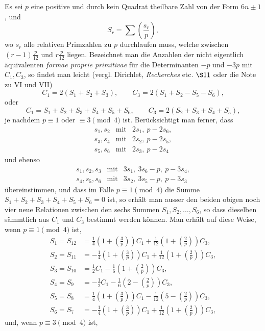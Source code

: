 \documentclass[12pt]{article}
\begin{document}
Es sei \(p\) eine positive und durch kein Quadrat theilbare Zahl von der Form \(6n\pm1\), und
\[
S_r=\sum\left(\frac{s_r}{p}\right),
\]
wo \(s_r\) alle relativen Primzahlen zu \(p\) durchlaufen muss, welche zwischen \((r-1)\frac p{12}\) und \(r\frac p{12}\) liegen. Bezeichnet man die Anzahlen der nicht eigentlich äquivalenten \emph{formae proprie primitivae} für die Determinanten \(-p\) und \(-3p\) mit \(C_1,C_3\), so findet man leicht (vergl. Dirichlet, \emph{Recherches} etc. \(\S 11\) oder die Note zu VI und VII)
\[
C_1=2(S_1+S_2+S_3),\qquad C_3=2(S_1+S_2-S_5-S_6),
\]
oder
\[
C_1=S_1+S_2+S_3+S_4+S_5+S_6,\qquad
C_3=2(S_2+S_3+S_4+S_5),
\]
je nachdem \(p\equiv1\) oder \(\equiv3\pmod4\) ist. Berücksichtigt man ferner, dass
\[
\begin{array}{rcl}
s_1,s_2&\text{mit}&2s_1,\ p-2s_6,\\
s_3,s_4&\text{mit}&2s_2,\ p-2s_5,\\
s_5,s_6&\text{mit}&2s_3,\ p-2s_4
\end{array}
\]
und ebenso
\[
\begin{array}{rcl}
s_1,s_2,s_3&\text{mit}&3s_1,\ 3s_6-p,\ p-3s_4,\\
s_4,s_5,s_6&\text{mit}&3s_2,\ 3s_5-p,\ p-3s_3
\end{array}
\]
übereinstimmen, und dass im Falle \(p\equiv1\pmod4\) die Summe \(S_1+S_2+S_3+S_4+S_5+S_6=0\) ist, so erhält man ausser den beiden obigen noch vier neue Relationen zwischen den sechs Summen \(S_1,S_2,\ldots,S_6\), so dass dieselben sämmtlich aus \(C_1\) und \(C_3\) bestimmt werden können. Man erhält auf diese Weise, wenn \(p\equiv1\pmod4\) ist,
\[
\begin{aligned}
S_1=S_{12}&=\frac14\left(1+\left(\frac3p\right)\right)C_1+\frac1{12}\left(1+\left(\frac2p\right)\right)C_3,\\
S_2=S_{11}&=-\frac14\left(1+\left(\frac3p\right)\right)C_1+\frac1{12}\left(1+\left(\frac2p\right)\right)C_3,\\
S_3=S_{10}&=\frac12C_1-\frac16\left(1+\left(\frac2p\right)\right)C_3,\\
S_4=S_9&=-\frac12C_1-\frac16\left(2-\left(\frac2p\right)\right)C_3,\\
S_5=S_8&=\frac14\left(1+\left(\frac3p\right)\right)C_1-\frac1{12}\left(5-\left(\frac2p\right)\right)C_3,\\
S_6=S_7&=-\frac14\left(1+\left(\frac3p\right)\right)C_1+\frac1{12}\left(1+\left(\frac2p\right)\right)C_3,
\end{aligned}
\]
und, wenn \(p\equiv3\pmod4\) ist,
\end{document}
